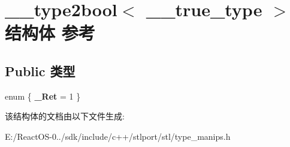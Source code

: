 \hypertarget{struct____type2bool_3_01____true__type_01_4}{}\section{\+\_\+\+\_\+type2bool$<$ \+\_\+\+\_\+true\+\_\+type $>$结构体 参考}
\label{struct____type2bool_3_01____true__type_01_4}
\subsection*{Public 类型}
\begin{DoxyCompactItemize}
\item 
\mbox{\label{struct____type2bool_3_01____true__type_01_4_a6b850a5bbbdeca9724f72cd9e2822dbd}} 
enum \{ {\bfseries \+\_\+\+Ret} = 1
 \}
\end{DoxyCompactItemize}


该结构体的文档由以下文件生成\+:\begin{DoxyCompactItemize}
\item 
E\+:/\+React\+O\+S-\/0../sdk/include/c++/stlport/stl/type\+\_\+manips.\+h\end{DoxyCompactItemize}
